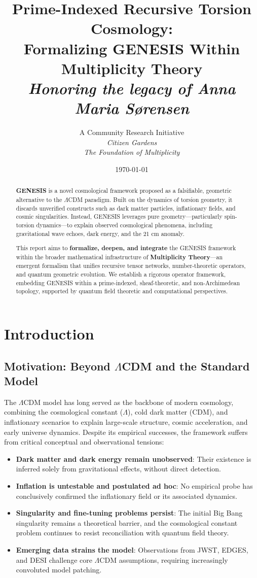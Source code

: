 \documentclass{article}
\title{\textbf{Prime-Indexed Recursive Torsion Cosmology:\\ Formalizing GENESIS Within Multiplicity Theory \\
\large \textit{Honoring the legacy of Anna Maria Sørensen}
}}
\author{A Community Research Initiative \\ \textit{Citizen Gardens \\ The Foundation of Multiplicity}}
\date{\today}
\theoremstyle{plain}
\begin{document}
\maketitle

\begin{abstract}
\textbf{GENESIS} is a novel cosmological framework proposed as a falsifiable, geometric alternative to the $\Lambda$CDM paradigm. Built on the dynamics of torsion geometry, it discards unverified constructs such as dark matter particles, inflationary fields, and cosmic singularities. Instead, GENESIS leverages pure geometry—particularly spin-torsion dynamics—to explain observed cosmological phenomena, including gravitational wave echoes, dark energy, and the 21 cm anomaly.

This report aims to \textbf{formalize, deepen, and integrate} the GENESIS framework within the broader mathematical infrastructure of \textbf{Multiplicity Theory}—an emergent formalism that unifies recursive tensor networks, number-theoretic operators, and quantum geometric evolution. We establish a rigorous operator framework, embedding GENESIS within a prime-indexed, sheaf-theoretic, and non-Archimedean topology, supported by quantum field theoretic and computational perspectives.
\end{abstract}


\section{Introduction}

\subsection{Motivation: Beyond \texorpdfstring{$\Lambda$CDM}{ΛCDM} and the Standard Model}

The $\Lambda$CDM model has long served as the backbone of modern cosmology, combining the cosmological constant ($\Lambda$), cold dark matter (CDM), and inflationary scenarios to explain large-scale structure, cosmic acceleration, and early universe dynamics. Despite its empirical successes, the framework suffers from critical conceptual and observational tensions:
\begin{itemize}
    \item \textbf{Dark matter and dark energy remain unobserved}: Their existence is inferred solely from gravitational effects, without direct detection.
    \item \textbf{Inflation is untestable and postulated ad hoc}: No empirical probe has conclusively confirmed the inflationary field or its associated dynamics.
    \item \textbf{Singularity and fine-tuning problems persist}: The initial Big Bang singularity remains a theoretical barrier, and the cosmological constant problem continues to resist reconciliation with quantum field theory.
    \item \textbf{Emerging data strains the model}: Observations from JWST, EDGES, and DESI challenge core $\Lambda$CDM assumptions, requiring increasingly convoluted model patching.
\end{itemize}
\end{document}
